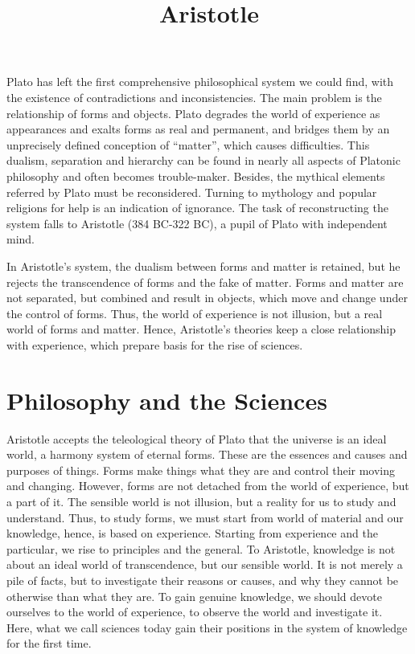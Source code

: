 \documentclass[11pt]{article}
\title{Aristotle}
\date{}
\begin{document}
  \maketitle

  \linenumbers
  
Plato has left the first comprehensive philosophical system we could find, with the existence of contradictions and inconsistencies. 
The main problem is the relationship of forms and objects. 
Plato degrades the world of experience as appearances and exalts forms as real and permanent, and bridges them by an unprecisely defined conception of “matter”, which causes difficulties. 
This dualism, separation and hierarchy can be found in nearly all aspects of Platonic philosophy and often becomes trouble-maker. 
Besides, the mythical elements referred by Plato must be reconsidered. 
Turning to mythology and popular religions for help is an indication of ignorance. 
The task of reconstructing the system falls to Aristotle (384 BC-322 BC), a pupil of Plato with independent mind.

\newline

In Aristotle’s system, the dualism between forms and matter is retained, but he rejects the transcendence of forms and the fake of matter. 
Forms and matter are not separated, but combined and result in objects, which move and change under the control of forms. 
Thus, the world of experience is not illusion, but a real world of forms and matter. 
Hence, Aristotle’s theories keep a close relationship with experience, which prepare basis for the rise of sciences. 

\section{Philosophy and the Sciences}
Aristotle accepts the teleological theory of Plato that the universe is an ideal world, a harmony system of eternal forms. 
These are the essences and causes and purposes of things. 
Forms make things what they are and control their moving and changing. 
However, forms are not detached from the world of experience, but a part of it. 
The sensible world is not illusion, but a reality for us to study and understand. 
Thus, to study forms, we must start from world of material and our knowledge, hence, is based on experience. 
Starting from experience and the particular, we rise to principles and the general. 
To Aristotle, knowledge is not about an ideal world of transcendence, but our sensible world. 
It is not merely a pile of facts, but to investigate their reasons or causes, and why they cannot be otherwise than what they are. 
To gain genuine knowledge, we should devote ourselves to the world of experience, to observe the world and investigate it. 
Here, what we call sciences today gain their positions in the system of knowledge for the first time.
\end{document}
